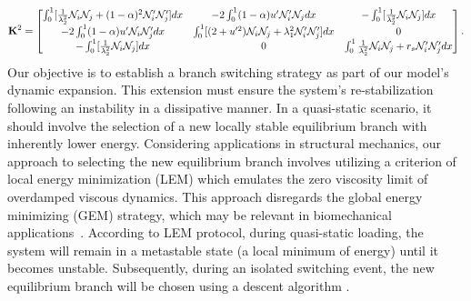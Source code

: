\begin{equation}
{\bf K}^2=\begin{bmatrix}
\int_0^1[ \frac{1}{\lambda_2^2}{\mathcal N}_i{\mathcal N}_j + (1-\alpha)^2{\mathcal N}'_i{\mathcal N}'_j] dx&
-2\int_0^1(1-\alpha)u' {\mathcal N}'_i {\mathcal N}_j  dx&
-\int_0^1[\frac{1}{\lambda_2^2}{\mathcal N}_i {\mathcal N}_j]  dx\\

-2\int_0^1(1-\alpha)u' {\mathcal N}_i {\mathcal N}'_j dx&
 \int_0^1 [ (2+u'^2){\mathcal N}_i{\mathcal N}_j +\lambda_1^2{\mathcal N}'_i{\mathcal N}'_j] dx&
 0\\

-\int_0^1[\frac{1}{\lambda_2^2}{\mathcal N}_i{\mathcal N}_j ] dx
&0
&\int_0^1\frac{1}{\lambda_2^2}{\mathcal N}_i {\mathcal N}_j+r_s{\mathcal N}'_i {\mathcal N}'_j  dx
\end{bmatrix}.
\label{eq:stifness2}
\end{equation}
Our objective is to establish a branch switching strategy as part of our model's dynamic expansion. This extension must ensure the system's re-stabilization following an instability in a dissipative manner. In a quasi-static scenario, it should involve the selection of a new locally stable equilibrium branch with inherently lower energy.  Considering applications in structural mechanics, our approach to selecting the new equilibrium branch involves utilizing a criterion of local energy minimization (LEM)  which emulates the zero viscosity limit of overdamped viscous dynamics. This approach disregards the global energy minimizing (GEM) strategy, which may be relevant in biomechanical applications~\cite{Salman2021-mn}. According to LEM protocol, during quasi-static loading, the system will remain in a metastable state (a local minimum of energy) until it becomes unstable. Subsequently, during an isolated switching event, the new equilibrium branch will be chosen using a descent algorithm \cite{Puglisi2005-lg}.
